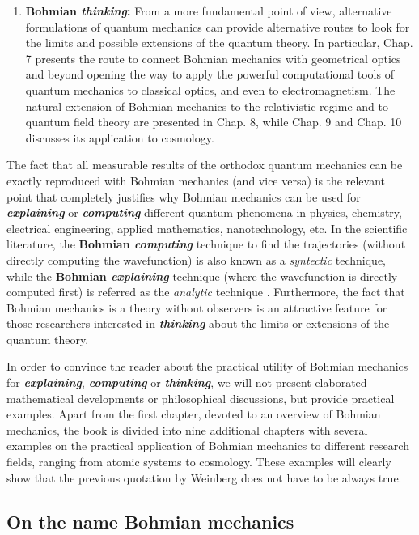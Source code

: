\documentclass[nofootinbib, secnumarabic, amsmath, nobibnotes,10pt,aps,pra]{revtex4-1}
\begin{document}
\begin{enumerate}
\item \textbf{Bohmian \emph{thinking}:} From a more fundamental point of view, alternative formulations of quantum mechanics can provide alternative routes to look for the limits and possible extensions of the quantum theory. In particular, Chap. 7 presents the route to connect Bohmian mechanics with geometrical optics and beyond opening the way to apply the powerful computational tools of quantum mechanics to classical optics, and even to electromagnetism. The natural extension of Bohmian mechanics to the relativistic regime and to quantum field theory are presented in Chap. 8, while Chap. 9 and Chap. 10 discusses its application to cosmology.
\end{enumerate}

The fact that all measurable results of the orthodox quantum mechanics can be exactly reproduced with Bohmian mechanics (and vice versa) is the relevant point that completely justifies why Bohmian mechanics can be used for \textbf{\emph{explaining}} or \textbf{\emph{computing}} different quantum phenomena in physics, chemistry, electrical engineering, applied mathematics, nanotechnology, etc. In the scientific literature, the \textbf{Bohmian \emph{computing}} technique to find the trajectories (without directly computing the wavefunction) is also known as a \emph{syntectic} technique, while the \textbf{Bohmian \emph{explaining}} technique (where the wavefunction is directly computed first) is referred as the \emph{analytic} technique \cite{om.wyatt2005}. Furthermore, the fact that Bohmian mechanics is a theory without observers is an attractive feature for those researchers interested in \textbf{\emph{thinking}} about the limits or extensions of the quantum theory.

In order to convince the reader about the practical utility of Bohmian mechanics for \textbf{\emph{explaining}}, \textbf{\emph{computing}} or \textbf{\emph{thinking}}, we will not present elaborated mathematical developments or philosophical discussions, but provide practical examples. Apart from the first chapter, devoted to an overview of Bohmian mechanics, the book is divided into nine additional chapters with several examples on the practical application of Bohmian mechanics to different research fields, ranging from atomic systems to cosmology. These examples will clearly show that the previous quotation by Weinberg does not have to be always true.


\subsection{On the name Bohmian mechanics}
\end{document}
